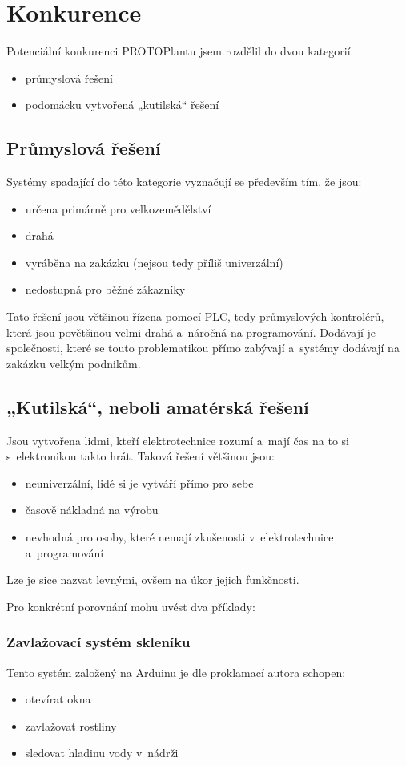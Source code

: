 \chapter{Konkurence}
Potenciální konkurenci PROTOPlantu jsem rozdělil do dvou kategorií:
\begin{itemize}
    \item průmyslová řešení
    \item podomácku vytvořená „kutilská“ řešení
\end{itemize}

\section{Průmyslová řešení}
Systémy spadající do této kategorie vyznačují se především tím, že jsou:
\begin{itemize}
    \item určena primárně pro velkozemědělství
    \item drahá
    \item vyráběna na zakázku (nejsou tedy příliš univerzální)
    \item nedostupná pro běžné zákazníky
\end{itemize}

Tato řešení jsou většinou řízena pomocí PLC, tedy průmyslových kontrolérů, která jsou povětšinou velmi drahá a~náročná na programování.
Dodávají je společnosti, které se touto problematikou přímo zabývají a~systémy dodávají na zakázku velkým podnikům.

\section{„Kutilská“, neboli amatérská řešení}
Jsou vytvořena lidmi, kteří elektrotechnice rozumí a~mají čas na to si s~elektronikou takto hrát.
Taková řešení většinou jsou:
\begin{itemize}
    \item neuniverzální, lidé si je vytváří přímo pro sebe
    \item časově nákladná na výrobu
    \item nevhodná pro osoby, které nemají zkušenosti v~elektrotechnice a~programování
\end{itemize}

Lze je sice nazvat levnými, ovšem na úkor jejich funkčnosti.

Pro konkrétní porovnání mohu uvést dva příklady:
\subsection{Zavlažovací systém skleníku \cite{ARDUGREENHOUSE}}
Tento systém založený na Arduinu je dle proklamací autora schopen:
\begin{itemize}
    \item otevírat okna
    \item zavlažovat rostliny
    \item sledovat hladinu vody v~nádrži
\end{itemize}

